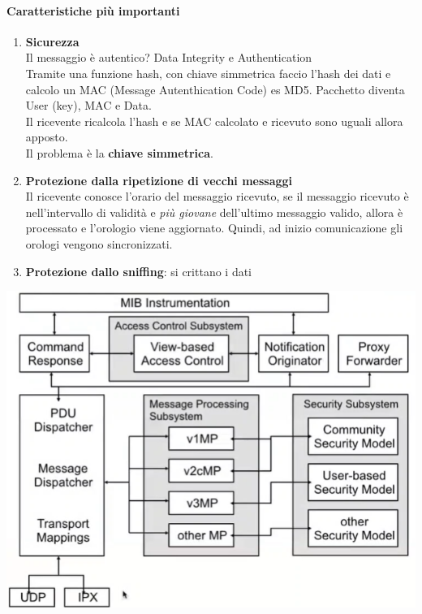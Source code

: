 \documentclass[10pt]{book}
\begin{document}
\paragraph{Caratteristiche più importanti} 
\begin{enumerate}
	\item \textbf{Sicurezza}\\
	Il messaggio è autentico? Data Integrity e Authentication\\
	Tramite una funzione hash, con chiave simmetrica faccio l'hash dei dati e calcolo un MAC (Message Autenthication Code) es MD5. Pacchetto diventa User (key), MAC e Data.\\
	Il ricevente ricalcola l'hash e se MAC calcolato e ricevuto sono uguali allora apposto.\\
	Il problema è la \textbf{chiave simmetrica}.
	\item \textbf{Protezione dalla ripetizione di vecchi messaggi}\\
	Il ricevente conosce l'orario del messaggio ricevuto, se il messaggio ricevuto è nell'intervallo di validità e \textit{più giovane} dell'ultimo messaggio valido, allora è processato e l'orologio viene aggiornato. Quindi, ad inizio comunicazione gli orologi vengono sincronizzati.
	\item \textbf{Protezione dallo sniffing}: si crittano i dati
\end{enumerate}
\begin{center}
	\includegraphics[scale=0.75]{snmp3arch.png}
\end{center}
\end{document}
